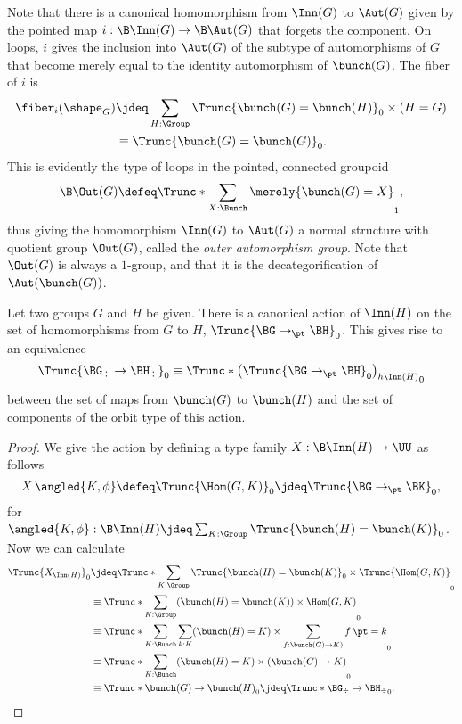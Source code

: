Note that there is a canonical homomorphism from $\Inn(G)$ to $\Aut(G)$
given by the pointed map $i : \B\Inn(G) \to \B\Aut(G)$ that forgets the component.
On loops, $i$ gives the inclusion into $\Aut(G)$ of the subtype of automorphisms of $G$
that become merely equal to the identity automorphism of $\bunch(G)$.
The fiber of $i$ is
\begin{align*}
  \fiber_i(\shape_G)
  &\jdeq \sum_{H : \Group} \Trunc{\bunch(G) = \bunch(H)}_0 \times (H = G) \\
  &\equiv \Trunc{\bunch(G) = \bunch(G)}_0.
\end{align*}
This is evidently the type of loops in the pointed, connected groupoid
\[
  \B\Out(G) \defeq \Trunc*{\sum_{X : \Bunch}\merely{\bunch(G) = X}}_1,
\]
thus giving the homomorphism $\Inn(G)$ to $\Aut(G)$ a normal structure with
quotient group $\Out(G)$, called the \emph{outer automorphism group}.
Note that $\Out(G)$ is always a $1$-group,
and that it is the decategorification of $\Aut(\bunch(G))$.

\begin{theorem}
  Let two groups $G$ and $H$ be given.
  There is a canonical action of $\Inn(H)$
  on the set of homomorphisms from $G$ to $H$, $\Trunc{\BG \to_\pt \BH}_0$.
  This gives rise to an equivalence
  \[
    \Trunc{\BG_\div \to \BH_\div}_0 \equiv \Trunc*{\left(\Trunc{\BG \to_\pt \BH}_0\right) _{h\Inn(H)}}_0
  \]
  between the set of maps from $\bunch(G)$ to $\bunch(H)$ and the set of
  components of the orbit type of this action.
\end{theorem}
\begin{proof}
  We give the action by defining a type family $X : \B\Inn(H) \to \UU$ as follows
  \[
    X\, \angled{K,\phi} \defeq \Trunc{\Hom(G,K)}_0 \jdeq \Trunc{\BG \to_\pt \BK}_0,
  \]
  for $\angled{K,\phi} : \B\Inn(H) \jdeq \sum_{K : \Group} \Trunc{\bunch(H) = \bunch(K)}_0$.
  Now we can calculate
  \begin{align*}
    \Trunc{X_{\Inn(H)}}_0
    &\jdeq \Trunc*{\sum_{K:\Group}\Trunc{\bunch(H)=\bunch(K)}_0\times\Trunc{\Hom(G,K)}}_0 \\
    &\equiv \Trunc*{\sum_{K:\Group}(\bunch(H)=\bunch(K))\times\Hom(G,K)}_0 \\
    &\equiv \Trunc*{\sum_{K:\Bunch}\sum_{k:K}(\bunch(H)=K)\times\sum_{f:\bunch(G)\to K)}\mathop f \pt = k}_0 \\
    &\equiv \Trunc*{\sum_{K:\Bunch} (\bunch(H)=K) \times(\bunch(G) \to K)}_0 \\
    &\equiv \Trunc*{\bunch(G)\to\bunch(H)}_0 \jdeq \Trunc*{\BG_\div \to \BH_\div}_0.\qedhere
  \end{align*}
\end{proof}

